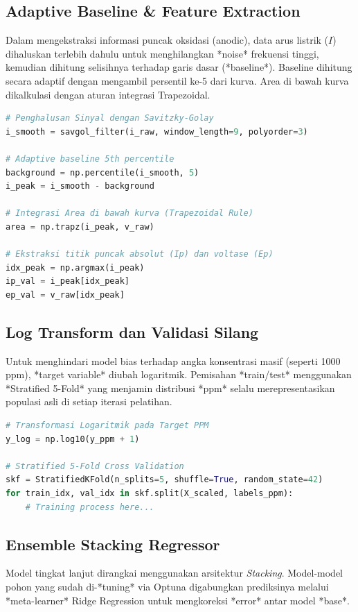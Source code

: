 \documentclass[10pt, twocolumn, a4paper]{article}
\begin{document}
\subsection{Adaptive Baseline \& Feature Extraction}
Dalam mengekstraksi informasi puncak oksidasi (anodic), data arus listrik ($I$) dihaluskan terlebih dahulu untuk menghilangkan *noise* frekuensi tinggi, kemudian dihitung selisihnya terhadap garis dasar (*baseline*). Baseline dihitung secara adaptif dengan mengambil persentil ke-5 dari kurva. Area di bawah kurva dikalkulasi dengan aturan integrasi Trapezoidal.

\begin{lstlisting}[language=Python, caption=Potongan Kode Feature Engineering Dual-Peak]
# Penghalusan Sinyal dengan Savitzky-Golay
i_smooth = savgol_filter(i_raw, window_length=9, polyorder=3)

# Adaptive baseline 5th percentile
background = np.percentile(i_smooth, 5)
i_peak = i_smooth - background

# Integrasi Area di bawah kurva (Trapezoidal Rule)
area = np.trapz(i_peak, v_raw)

# Ekstraksi titik puncak absolut (Ip) dan voltase (Ep)
idx_peak = np.argmax(i_peak)
ip_val = i_peak[idx_peak]
ep_val = v_raw[idx_peak]
\end{lstlisting}

\subsection{Log Transform dan Validasi Silang}
Untuk menghindari model bias terhadap angka konsentrasi masif (seperti 1000 ppm), *target variable* diubah logaritmik. Pemisahan *train/test* menggunakan *Stratified 5-Fold* yang menjamin distribusi *ppm* selalu merepresentasikan populasi asli di setiap iterasi pelatihan.

\begin{lstlisting}[language=Python, caption=Transformasi Logaritmik dan Stratified K-Fold]
# Transformasi Logaritmik pada Target PPM
y_log = np.log10(y_ppm + 1)

# Stratified 5-Fold Cross Validation
skf = StratifiedKFold(n_splits=5, shuffle=True, random_state=42)
for train_idx, val_idx in skf.split(X_scaled, labels_ppm):
    # Training process here...
\end{lstlisting}

\subsection{Ensemble Stacking Regressor}
Model tingkat lanjut dirangkai menggunakan arsitektur \textit{Stacking}. Model-model pohon yang sudah di-*tuning* via Optuna digabungkan prediksinya melalui *meta-learner* Ridge Regression untuk mengkoreksi *error* antar model *base*.
\end{document}
